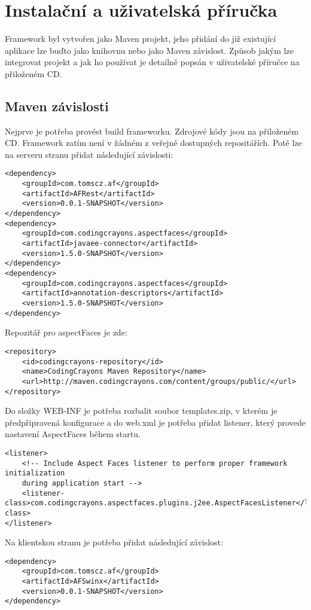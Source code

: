 \chapter{Instalační a uživatelská příručka}
Framework byl vytvořen jako Maven projekt, jeho přidání do již existující aplikace lze buďto jako knihovnu nebo jako Maven závislost. Způsob jakým lze integrovat projekt a jak ho používat je detailně popsán v uživatelské příručce na přiloženém CD. 
\section{Maven závislosti}
Nejprve je potřeba provést build frameworku. Zdrojové kódy jsou na přiloženém CD. Framework zatím není v žádném z veřejně dostupných repositářích. Poté lze na serveru stranu přidat následující závislosti:
\begin{lstlisting}[caption={Závislosti na serveru},
label={code:mavenDependency}, basicstyle=\footnotesize]
<dependency>
	<groupId>com.tomscz.af</groupId>
	<artifactId>AFRest</artifactId>
	<version>0.0.1-SNAPSHOT</version>
</dependency>
<dependency>
	<groupId>com.codingcrayons.aspectfaces</groupId>
	<artifactId>javaee-connector</artifactId>
	<version>1.5.0-SNAPSHOT</version>
</dependency>
<dependency>
	<groupId>com.codingcrayons.aspectfaces</groupId>
	<artifactId>annotation-descriptors</artifactId>
	<version>1.5.0-SNAPSHOT</version>
</dependency>
\end{lstlisting}
Repozitář pro aspectFaces je zde:
\begin{lstlisting}[caption={AspectFaces repozitář },
label={code:mavenAspectFacesRepo}]
<repository>
	<id>codingcrayons-repository</id>
	<name>CodingCrayons Maven Repository</name>
	<url>http://maven.codingcrayons.com/content/groups/public/</url>
</repository>
\end{lstlisting}
Do složky WEB-INF je potřeba rozbalit soubor templates.zip, v kterém je předpřipravená konfigurace a do web.xml je potřeba přidat listener, který provede nastavení AspectFaces během startu. 
\begin{lstlisting}[caption={AspectFaces listener},
label={code:mavenAspectFacesBootStrap}, basicstyle=\footnotesize]
<listener>
	<!-- Include Aspect Faces listener to perform proper framework initialization 
	during application start -->
	<listener-class>com.codingcrayons.aspectfaces.plugins.j2ee.AspectFacesListener</listener-class>
</listener>
\end{lstlisting}
Na klientskou stranu je potřeba přidat následující závislost:
\begin{lstlisting}[caption={Závislost na klientské straně},
label={code:mavenAFSwinx}, basicstyle=\footnotesize]
<dependency>
	<groupId>com.tomscz.af</groupId>
	<artifactId>AFSwinx</artifactId>
	<version>0.0.1-SNAPSHOT</version>
</dependency>
\end{lstlisting}
